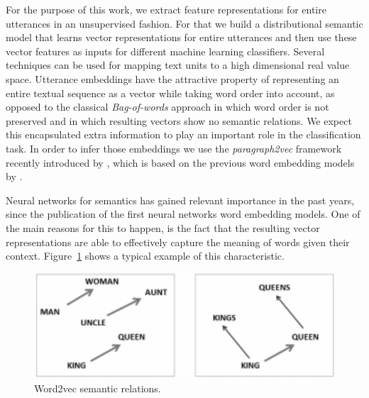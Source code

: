 For the purpose of this work, we extract feature representations for entire utterances in an unsupervised fashion.
For that we build a distributional semantic model that learns vector representations for entire utterances and then use these vector features as inputs for different machine learning classifiers.
Several techniques can be used for mapping text units to a high dimensional real value space.
Utterance embeddings have the attractive property of representing an entire textual sequence as a vector while taking word order into account, as opposed to the classical \emph{Bag-of-words} approach in which word order is not preserved and in which resulting vectors show no semantic relations.
We expect this encapsulated extra information to play an important role in the classification task. In order to infer those embeddings we use the \emph{paragraph2vec} framework recently introduced by \cite{le2014distributed}, which is based on the previous word embedding models by \cite{mikolov2013efficient}.


Neural networks for semantics has gained relevant importance in the past years, since the publication of the first neural networks word embedding models. One of the main reasons for this to happen, is the fact that the resulting vector representations are able to effectively capture the meaning of words given their context. Figure~\ref{fig:w2v_example} shows a typical example of this characteristic. 


\begin{figure}
\centering
\begin{minipage}{.4\textwidth}
\includegraphics[width=1\textwidth]{img/w2v_example}
\caption{Word2vec semantic relations.}
\label{fig:w2v_example}
\end{minipage}
\end{figure}

